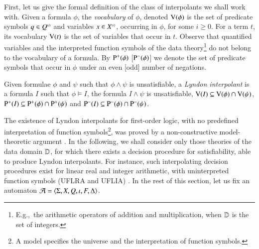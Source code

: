 \documentclass{llncs}
\begin{document}
First, let us give the formal definition of the class of interpolants
we shall work with. Given a formula $\phi$, the \emph{vocabulary} of
$\phi$, denoted $\mathrm{V}({\phi})$ is the set of predicate symbols $q \in
{Q}^{\scriptscriptstyle{({i})}}$ and variables $x \in {X}^{\scriptscriptstyle{({i})}}$, occurring in $\phi$,
for some $i\geq0$. For a term $t$, its vocabulary $\mathrm{V}({t})$ is the set
of variables that occur in $t$. Observe that quantified variables and
the interpreted function symbols of the data
theory\footnote{E.g.,\ the arithmetic operators of addition and
  multiplication, when $\mathbb{D}$ is the set of integers.}  do not belong
to the vocabulary of a formula. By $\mathrm{P}^{+}(\phi)$ [$\mathrm{P}^{-}(\phi)$]
we denote the set of predicate symbols that occur in $\phi$ under an
even [odd] number of negations.

\begin{definition}\label{def:lyndon-interpolant}
Given formulae $\phi$ and $\psi$ such that $\phi \wedge \psi$ is
unsatisfiable, a \emph{Lyndon interpolant} is a formula $I$ such that
$\phi \models I$, the formula $I \wedge \psi$ is unsatisfiable,
$\mathrm{V}({I}) \subseteq \mathrm{V}({\phi}) \cap \mathrm{V}({\psi})$, $\mathrm{P}^{+}(I) \subseteq
\mathrm{P}^{+}(\phi) \cap \mathrm{P}^{+}(\psi)$ and $\mathrm{P}^{-}(I) \subseteq
\mathrm{P}^{-}(\phi) \cap \mathrm{P}^{-}(\psi)$.
\end{definition}
The existence of Lyndon interpolants for first-order logic, with no
predefined interpretation of function symbols\footnote{A model
  specifies the universe and the interpretation of function symbols.},
was proved by a non-constructive model-theoretic argument
\cite{Lyndon59}. In the following, we shall consider only those
theories of the data domain $\mathbb{D}$, for which there exists a decision
procedure for satisfiability, able to produce Lyndon interpolants. For
instance, such interpolating decision procedures exist for linear real
and integer arithmetic, with uninterpreted function symbols (UFLRA and
UFLIA) \cite{RybalchenkoSofronieStokkermans}. In the rest of this
section, let us fix an automaton $\mathcal{A} =
\langle \Sigma,X,Q,\iota,F,\Delta \rangle$.
\end{document}
